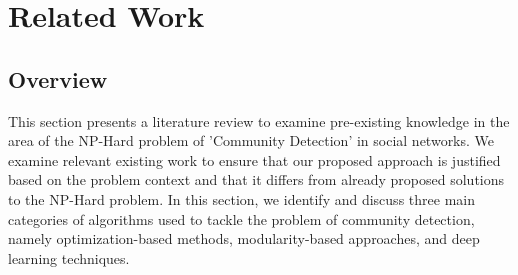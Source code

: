 \documentclass{article}
\begin{document}
\section{Related Work}
\subsection{Overview}
This section presents a literature review to examine pre-existing knowledge in the area of the NP-Hard problem of 'Community Detection' in social networks. We examine relevant existing work to ensure that our proposed approach is justified based on the problem context and that it differs from already proposed solutions to the NP-Hard problem. In this section, we identify and discuss three main categories of algorithms used to tackle the problem of community detection, namely optimization-based methods, modularity-based approaches, and deep learning techniques.
\end{document}
